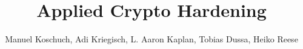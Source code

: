 \documentclass{llncs}
\begin{document}
\title{Applied Crypto Hardening}

\author{ Manuel Koschuch, Adi Kriegisch, L. Aaron Kaplan, Tobias Dussa, Heiko Reese}


\maketitle














\end{document}
